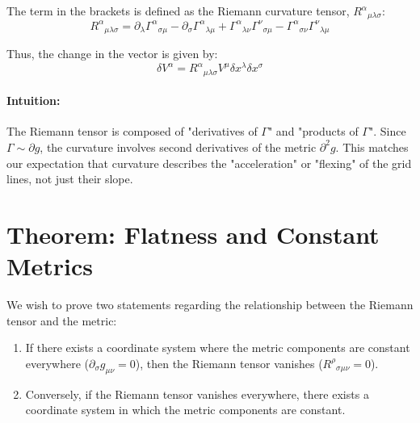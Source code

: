\documentclass[11pt, a4paper]{report}
\begin{document}
The term in the brackets is defined as the Riemann curvature tensor, ${R^{\alpha}}_{\mu\lambda\sigma}$:
\begin{equation}
    {R^{\alpha}}_{\mu\lambda\sigma} = \partial_{\lambda} {\Gamma^{\alpha}}_{\sigma\mu} - \partial_{\sigma} {\Gamma^{\alpha}}_{\lambda\mu} + {\Gamma^{\alpha}}_{\lambda\nu} {\Gamma^{\nu}}_{\sigma\mu} - {\Gamma^{\alpha}}_{\sigma\nu} {\Gamma^{\nu}}_{\lambda\mu}
\end{equation}

Thus, the change in the vector is given by:
\begin{equation}
    \delta V^{\alpha} = {R^{\alpha}}_{\mu\lambda\sigma} V^{\mu} \delta x^{\lambda} \delta x^{\sigma}
\end{equation}
\paragraph{Intuition:} The Riemann tensor is composed of "derivatives of \(\Gamma\)" and "products of \(\Gamma\)". Since \(\Gamma \sim \partial g\), the curvature involves second derivatives of the metric \(\partial^2 g\). This matches our expectation that curvature describes the "acceleration" or "flexing" of the grid lines, not just their slope.
\section*{Theorem: Flatness and Constant Metrics}

We wish to prove two statements regarding the relationship between the Riemann tensor and the metric:
\begin{enumerate}
    \item If there exists a coordinate system where the metric components are constant everywhere ($\partial_\sigma g_{\mu\nu} = 0$), then the Riemann tensor vanishes ($R^\rho{}_{\sigma\mu\nu} = 0$).
    \item Conversely, if the Riemann tensor vanishes everywhere, there exists a coordinate system in which the metric components are constant.
\end{enumerate}
\end{document}
